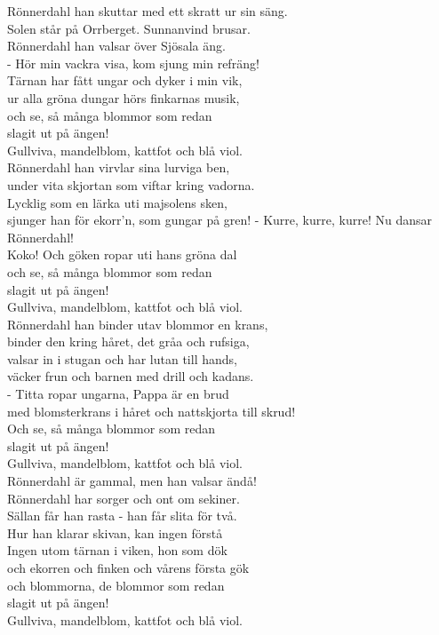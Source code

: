 \documentclass[a6paper, 10pt, twoside]{article}
\begin{document}
\begin{lyrics}
Rönnerdahl han skuttar med ett skratt ur sin säng.\\
Solen står på Orrberget. Sunnanvind brusar.\\
Rönnerdahl han valsar över Sjösala äng.\\
- Hör min vackra visa, kom sjung min refräng!
\vspace{5pt}\\
Tärnan har fått ungar och dyker i min vik,\\
ur alla gröna dungar hörs finkarnas musik,\\
och se, så många blommor som redan \\
slagit ut på ängen!\\
Gullviva, mandelblom, kattfot och blå viol.
\vspace{5pt}\\
Rönnerdahl han virvlar sina lurviga ben,\\
under vita skjortan som viftar kring vadorna.\\
Lycklig som en lärka uti majsolens sken,\\
sjunger han för ekorr'n, som gungar på gren!
\noindent
- Kurre, kurre, kurre! Nu dansar Rönnerdahl!\\
Koko! Och göken ropar uti hans gröna dal\\
och se, så många blommor som redan \\
slagit ut på ängen!\\
Gullviva, mandelblom, kattfot och blå viol.
\vspace{5pt}\\
Rönnerdahl han binder utav blommor en krans,\\
binder den kring håret, det gråa och rufsiga,\\
valsar in i stugan och har lutan till hands,\\
väcker frun och barnen med drill och kadans.
\vspace{5pt}\\
- Titta ropar ungarna, Pappa är en brud\\
med blomsterkrans i håret och nattskjorta till skrud!\\
Och se, så många blommor som redan \\
slagit ut på ängen!\\
Gullviva, mandelblom, kattfot och blå viol.
\vspace{5pt}\\
Rönnerdahl är gammal, men han valsar ändå!\\
Rönnerdahl har sorger och ont om sekiner.\\
Sällan får han rasta - han får slita för två.\\
Hur han klarar skivan, kan ingen förstå
\vspace{5pt}\\
Ingen utom tärnan i viken, hon som dök\\
och ekorren och finken och vårens första gök\\
och blommorna, de blommor som redan \\
slagit ut på ängen!\\
Gullviva, mandelblom, kattfot och blå viol. 
\end{lyrics}
\end{document}
